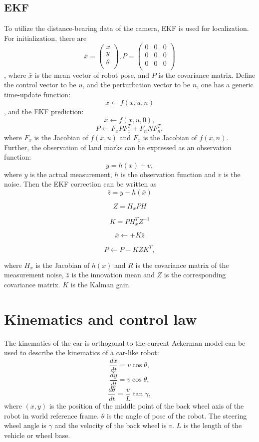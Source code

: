 \documentclass[12pt]{article}
\begin{document}
\subsection{EKF}
To utilize the distance-bearing data of the camera, EKF is used for localization.  For initialization, there are 
$$
\bar x =\begin{pmatrix}
x \\
y\\
\theta \\
\end{pmatrix},
P=
\begin{pmatrix}
0 & 0 & 0 \\
0  & 0 &0 \\
0 & 0 & 0 \\
\end{pmatrix}
$$,
where $\bar x$ is the mean vector of robot pose, and $P$ is the covariance matrix. Define the control vector to be $u$, and the perturbation vector to be $n$, one has a generic time-update function:
$$
x \leftarrow f(x,u,n)
$$,
and the EKF prediction:
$$
\bar x \leftarrow f(\bar x, u, 0),
$$
$$
P \leftarrow F_xPF_x^T+F_nNF_n^T,
$$ 
where $F_x$ is the Jacobian of $f(\bar x, u)$ and $F_x$ is the Jacobian of $f(\bar x, n)$.
Further, the observation of land marks can be expressed as an observation function:
$$
y=h(x)+v,
$$
 where $y$ is the actual measurement, $h$ is the observation function and $v$ is the noise. Then the EKF correction can be written as 
 $$
 \bar z = y- h(\bar x)
 $$
 
 $$
  Z=H_xPH
 $$
 
 $$  
 K=PH_x^TZ^{-1}
$$

$$
\bar x \leftarrow +K \bar z
$$

$$
P \leftarrow P-KZK^T,
$$

where $H_x$ is the Jacobian of $h(x)$ and $R$ is the covariance matrix of the measurement noise, $\bar z$ is the innovation mean and $Z$ is the corresponding covariance matrix. $K$ is the Kalman gain.

\section{Kinematics and control law}
\label{kine}
The kinematics of the car is orthogonal to the current 
Ackerman model can be used to describe the kinematics of a car-like robot: 
$$\frac{d x}{dt}=v\cos \theta,$$
$$\frac{d y}{dt}=v\cos \theta,$$
$$\frac{d \theta}{dt}=\frac{v}{L}\tan \gamma,$$
where $(x,y)$ is the position of the middle point of the back wheel axis of the robot in world reference frame. $\theta$ is the angle of pose of the robot. The steering wheel angle is $\gamma$ and the velocity of the back wheel is $v$. $L$ is the length of the vehicle or wheel base.
\end{document}

